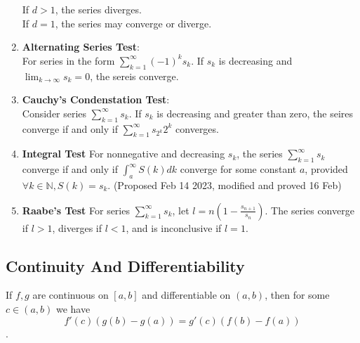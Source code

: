 \documentclass[12pt]{article}
\begin{document}
\begin{theorem}
\begin{enumerate}
		If $d>1$, the series diverges.\\
		If $d=1$, the series may converge or diverge.
	\item \textbf{Alternating Series Test}: \label{AlternatingSeriesTest}\\
		For series in the form $\sum^{\infty}_{k=1}(-1)^{k}s_k$. If $s_k$ is decreasing and $\lim_{k\to \infty} s_k = 0$, the sereis converge. 
	\item \label{Cauchy_Condensation_Test} \textbf{Cauchy's Condenstation Test}:\\
		Consider series $\sum^{\infty}_{k=1}s_k$. If ${s_k}$ is decreasing and greater than zero, the seires converge if and only if $\sum^{\infty}_{k=1}s_{2^k}2^k $ converges. 
	\item \textbf{Integral Test}\label{IntegralTest}
		For nonnegative and decreasing $s_k$, the series $\sum^{\infty}_{k=1}s_k$ converge if and only if $\int_{a}^{\infty}S(k)dk$ converge for some constant $a$, provided $\forall k \in \mathbb{N}, S(k)=s_k$.
		(Proposed Feb 14 2023, modified and proved 16 Feb)
	\item \textbf{Raabe's Test}\label{Raabe's Test}
		For series $\sum^{\infty}_{k=1}s_k$, let $l= \displaystyle n\left(1-\frac{s_{n+1}}{s_n}\right)$. The series converge if $l>1$, diverges if $l<1$, and is inconclusive if $l=1$.

\end{enumerate}
\end{theorem}
\subsection{Continuity And Differentiability}

\begin{theorem}
	If $f,g$ are continuous on $[a,b]$ and differentiable on $(a,b)$, then for some $c \in (a,b)$ we have
	\[
		f'(c)(g(b)-g(a))=g'(c)(f(b)-f(a))
	\]
	.
\end{theorem}



\end{document}

